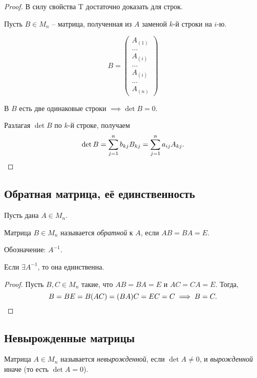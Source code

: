 \begin{proof}
    В силу свойства T достаточно доказать для строк.

    Пусть $B \in M_n$ -- матрица, полученная из $A$ заменой $k$-й строки на $i$-ю.

    \begin{equation*}
        B = \begin{pmatrix}
            A_{(1)} \\ \dots \\ A_{(i)} \\ \dots \\ A_{(i)} \\ \dots \\ A_{(n)}
        \end{pmatrix}
    \end{equation*}

    В $B$ есть две одинаковые строки $\implies \det B = 0$.

    Разлагая $\det B$ по $k$-й строке, получаем
    \begin{equation*}
        \det B = \sum_{j = 1}^n b_{kj} B_{kj} = \sum_{j = 1}^n a_{ij} A_{kj}
    .\qedhere\end{equation*}
\end{proof}


\subsection{Обратная матрица, её единственность}

Пусть дана $A \in M_n$.

\begin{definition}
    Матрица $B \in M_n$ называется \textit{обратной} к $A$, если $AB = BA = E$.

    Обозначение: $A^{-1}$.
\end{definition}


\begin{lemma}
    Если $\exists A^{-1}$, то она единственна.
\end{lemma}

\begin{proof}
    Пусть $B, C \in M_n$ такие, что $AB = BA = E$ и $AC = CA = E$. Тогда,
    \begin{equation*}
        B = BE = B(AC) = (BA)C = EC = C \implies B = C
    .\qedhere\end{equation*}
\end{proof}


\subsection{Невырожденные матрицы}
\begin{definition}
    Матрица $A \in M_n$ называется \textit{невырожденной}, если $\det A \neq 0$, и \textit{вырожденной} иначе (то есть $\det A = 0$).
\end{definition}


